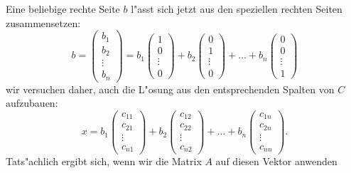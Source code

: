 Eine beliebige rechte Seite $b$ l"asst sich jetzt aus den speziellen rechten
Seiten zusammensetzen:
$$b=\begin{pmatrix}b_1\\b_2\\\vdots\\b_n\end{pmatrix}
=
b_1\begin{pmatrix}1\\0\\\vdots\\0\end{pmatrix}
+
b_2\begin{pmatrix}0\\1\\\vdots\\0\end{pmatrix}
+\dots+
b_n\begin{pmatrix}0\\0\\\vdots\\1\end{pmatrix}
$$
wir versuchen daher, auch die L"osung aus den entsprechenden Spalten von $C$
aufzubauen:
\begin{equation}
x
=
b_1\begin{pmatrix}c_{11}\\c_{21}\\\vdots\\c_{n1}\end{pmatrix}
+
b_2\begin{pmatrix}c_{12}\\c_{22}\\\vdots\\c_{n2}\end{pmatrix}
+\dots+
b_n\begin{pmatrix}c_{1n}\\c_{2n}\\\vdots\\c_{nn}\end{pmatrix}.
\label{zusammensetzen}
\end{equation}
Tats"achlich ergibt sich, wenn wir die Matrix $A$ auf diesen Vektor
anwenden
